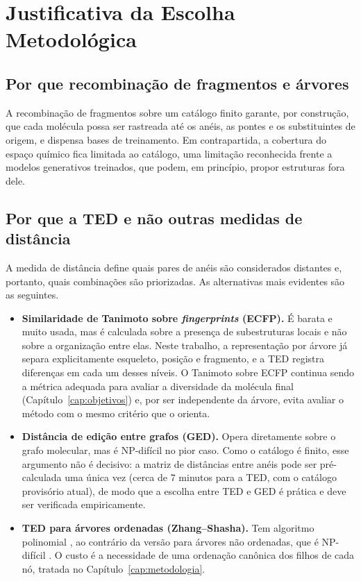 \chapter{Justificativa da Escolha Metodológica}
\label{cap:justificativa-metodologica}

\section{Por que recombinação de fragmentos e árvores}

A recombinação de fragmentos sobre um catálogo finito garante, por construção, que cada molécula possa ser rastreada até os anéis, as pontes e os substituintes de origem, e dispensa bases de treinamento. Em contrapartida, a cobertura do espaço químico fica limitada ao catálogo, uma limitação reconhecida frente a modelos generativos treinados, que podem, em princípio, propor estruturas fora dele.

\section{Por que a TED e não outras medidas de distância}

A medida de distância define quais pares de anéis são considerados distantes e, portanto, quais combinações são priorizadas. As alternativas mais evidentes são as seguintes.

\begin{itemize}
	\item \textbf{Similaridade de Tanimoto sobre \textit{fingerprints} (ECFP).} É barata e muito usada, mas é calculada sobre a presença de subestruturas locais e não sobre a organização entre elas. Neste trabalho, a representação por árvore já separa explicitamente esqueleto, posição e fragmento, e a TED registra diferenças em cada um desses níveis. O Tanimoto sobre ECFP continua sendo a métrica adequada para avaliar a diversidade da molécula final (Capítulo~\ref{cap:objetivos}) e, por ser independente da árvore, evita avaliar o método com o mesmo critério que o orienta.
	\item \textbf{Distância de edição entre grafos (GED).} Opera diretamente sobre o grafo molecular, mas é NP-difícil no pior caso. Como o catálogo é finito, esse argumento não é decisivo: a matriz de distâncias entre anéis pode ser pré-calculada uma única vez (cerca de 7 minutos para a TED, com o catálogo provisório atual), de modo que a escolha entre TED e GED é prática e deve ser verificada empiricamente.
	\item \textbf{TED para árvores ordenadas (Zhang--Shasha).} Tem algoritmo polinomial \cite{zhang_shasha_1989,bille_2005}, ao contrário da versão para árvores não ordenadas, que é NP-difícil \cite{zhang_statman_shasha_1992}. O custo é a necessidade de uma ordenação canônica dos filhos de cada nó, tratada no Capítulo~\ref{cap:metodologia}.
\end{itemize}

